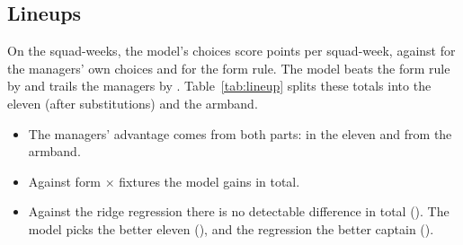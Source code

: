 \documentclass[11pt,a4paper]{article}
\begin{document}
\begin{table}[ht]
\centering
\scriptsize
\setlength{\tabcolsep}{3.5pt}
\caption{Captain comparisons under alternative inference. Columns: comparator points per week; the
model's mean advantage with the independent-week interval; the within-season six-week block
bootstrap interval; season means; and the mean over regular weeks (every club playing once).
$^a$Blocks never cross a season. $^b$Cohort defined after the season; retrospective reference.}
\label{tab:captainrobust}

\end{table}

\subsection{Lineups}
On the \nSquadWeeks{} squad-weeks, the model's choices score \lineModel{} points per squad-week,
against \lineManager{} for the managers' own choices and \lineForm{} for the form rule. The model
beats the form rule by \lineVsForm{} and trails the managers by \lineVsManager{}.
Table~\ref{tab:lineup} splits these totals into the eleven (after substitutions) and the armband.
\begin{itemize}
  \item The managers' advantage comes from both parts: \lineElevenVsManager{} in the eleven and
        \lineArmVsManager{} from the armband.
  \item Against form $\times$ fixtures the model gains \lineVsFormScaled{} in total.
  \item Against the ridge regression there is no detectable difference in total (\lineVsReg{}). The
        model picks the better eleven (\lineElevenVsReg{}), and the regression the better captain
        (\lineArmVsReg{}).
\end{itemize}

\begin{table}[ht]
\centering
\scriptsize
\caption{Lineup points per squad-week, split into the eleven and the armband, and the model's
paired differences with 95\% intervals.}
\label{tab:lineup}

\end{table}
\end{document}
